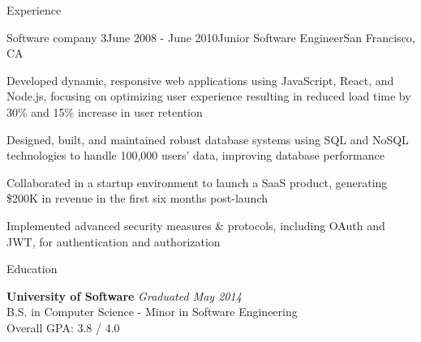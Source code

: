 \documentclass[
	11pt, %
]{resume} %
\begin{document}
\begin{rSection}{Experience}
	\begin{rSubsection}{Software company 3}{June 2008 - June 2010}{Junior Software Engineer}{San Francisco, CA}
		\item Developed dynamic, responsive web applications using JavaScript, React, and Node.js, focusing on optimizing user experience resulting in reduced load time by 30\% and 15\% increase in user retention
		\item Designed, built, and maintained robust database systems using SQL and NoSQL technologies to handle 100,000 users' data, improving database performance
		\item Collaborated in a startup environment to launch a SaaS product, generating \$200K in revenue in the first six months post-launch 
		\item Implemented advanced security measures & protocols, including OAuth and JWT, for authentication and authorization
	\end{rSubsection}

\end{rSection}



\begin{rSection}{Education}
	
	\textbf{University of Software} \hfill \textit{Graduated May 2014} \\ 
	B.S. in Computer Science - Minor in Software Engineering \smallskip \\
	Overall GPA: 3.8 / 4.0

\end{rSection}


\begin{comment}

\begin{rSection}{Certifications}

-- AWS Certified Cloud Practitioner \\
-- Azure 104: Microsoft Azure Administrator  \\
-- Cisco Certified Network Associate (CCNA) \\

\end{rSection}

\end{comment}
\end{document}

